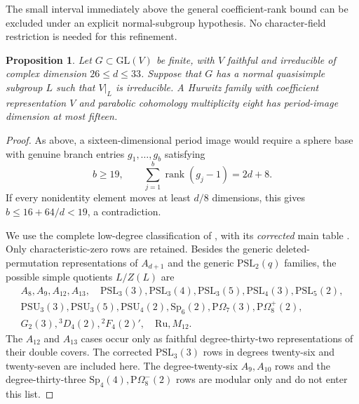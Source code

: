 \documentclass[11pt]{article}
\newtheorem{proposition}[theorem]{Proposition}
\theoremstyle{definition}
\theoremstyle{remark}
\begin{document}
The small interval immediately above the general coefficient-rank bound
can be excluded under an explicit normal-subgroup hypothesis.  No
character-field restriction is needed for this refinement.

\begin{proposition}\label{prop:quasisimple-degrees26-33}
Let $G\subset\mathrm{GL}(V)$ be finite, with $V$ faithful and irreducible
of complex dimension $26\le d\le33$.  Suppose that $G$ has a normal
quasisimple subgroup $L$ such that $V|_L$ is irreducible.
A Hurwitz family with coefficient representation $V$ and parabolic
cohomology multiplicity eight has period-image dimension at most fifteen.
\end{proposition}

\begin{proof}
As above, a sixteen-dimensional period image would require a sphere
base with genuine branch entries $g_1,\ldots,g_b$ satisfying
\[
 b\ge19,\qquad
 \sum_{j=1}^b\operatorname{rank}(g_j-1)=2d+8.
\]
If every nonidentity element moves at least $d/8$ dimensions, this gives
$b\le16+64/d<19$, a contradiction.

We use the complete low-degree classification of
\cite[Theorem~1, p.~22; Table~2, p.~31]{HissMalle}, with its
\emph{corrected} main table
\cite[Table~2, pp.~102--103]{HissMalleCorrection}.
Only characteristic-zero rows are retained.  Besides the generic
deleted-permutation representations of $A_{d+1}$ and the generic
$\mathrm{PSL}_2(q)$ families, the possible simple quotients $L/Z(L)$ are
\[
\begin{gathered}
 A_8,A_9,A_{12},A_{13},\quad
 \mathrm{PSL}_3(3),\mathrm{PSL}_3(4),\mathrm{PSL}_3(5),
 \mathrm{PSL}_4(3),\mathrm{PSL}_5(2),\\
 \mathrm{PSU}_3(3),\mathrm{PSU}_3(5),\mathrm{PSU}_4(2),
 \mathrm{Sp}_6(2),\mathrm{P}\Omega_7(3),
 \mathrm{P}\Omega^+_8(2),\\
 G_2(3),{}^3D_4(2),{}^2F_4(2)',\quad \mathrm{Ru},M_{12}.
\end{gathered}
\]
The $A_{12}$ and $A_{13}$ cases occur only as faithful degree-thirty-two
representations of their double covers.  The corrected
$\mathrm{PSL}_3(3)$ rows in degrees twenty-six and twenty-seven are
included here.  The degree-twenty-six $A_9,A_{10}$ rows and the
degree-thirty-three $\mathrm{Sp}_4(4),\mathrm{P}\Omega^-_8(2)$ rows are
modular only and do not enter this list.


\end{proof}
\end{document}
